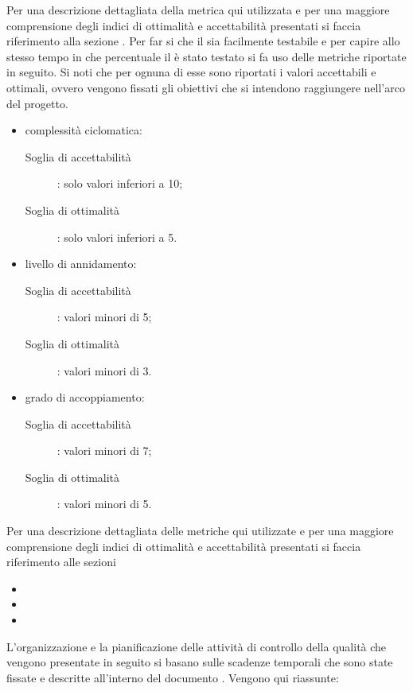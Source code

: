 					Per una descrizione dettagliata della metrica qui utilizzata e per una maggiore comprensione degli indici di ottimalità e accettabilità presentati si faccia riferimento alla sezione .
					Per far si che il  sia facilmente testabile e per capire allo stesso tempo in che percentuale il  è stato testato si fa uso delle metriche riportate in seguito. Si noti che per ognuna di esse sono riportati i valori accettabili e ottimali, ovvero vengono fissati gli obiettivi che si intendono raggiungere nell'arco del progetto.
					\begin{itemize}
						\item complessità ciclomatica:
						\begin{description}
							\item[Soglia di accettabilità]: solo valori inferiori a 10;
							\item[Soglia di ottimalità]: solo valori inferiori a 5.
						\end{description}
						\item livello di annidamento:
						\begin{description}
							\item[Soglia di accettabilità]: valori minori di 5;
							\item[Soglia di ottimalità]: valori minori di 3.
						\end{description}
						\item grado di accoppiamento:
						\begin{description}
							\item[Soglia di accettabilità]: valori minori di 7;
							\item[Soglia di ottimalità]: valori minori di 5.
						\end{description}
					\end{itemize}
					Per una descrizione dettagliata delle metriche qui utilizzate e per una maggiore comprensione degli indici di ottimalità e accettabilità presentati si faccia riferimento alle sezioni
					\begin{itemize}
						\item {}
						\item {}
						\item {}
					\end{itemize}	
		L'organizzazione e la pianificazione delle attività di controllo della qualità che vengono presentate in seguito si basano sulle scadenze temporali che sono state fissate e descritte all'interno del documento . Vengono qui riassunte:
